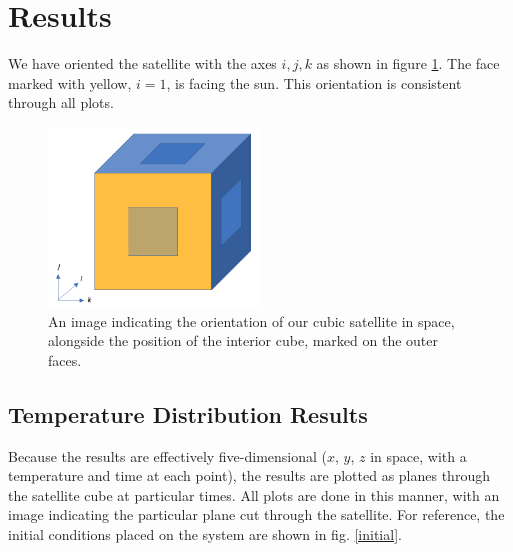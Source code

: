 \documentclass[12pt]{article}
\begin{document}
\section*{Results}
We have oriented the satellite with the axes $i, j,k$ as shown in figure \ref{justbox}.  The face marked with yellow, $i = 1$, is facing the sun.  This orientation is consistent through all plots.

\begin{figure}
\begin{center}
\includegraphics[width = 0.5\textwidth]{../pics/justbox.png}
\end{center}
\caption{\label{justbox} An image indicating the orientation of our cubic satellite in space, alongside the position of the interior cube, marked on the outer faces.}
\end{figure}
\subsection*{Temperature Distribution Results}
Because the results are effectively five-dimensional ($x$, $y$, $z$ in space, with a temperature and time at each point), the results are plotted as planes through the satellite cube at particular times.  All plots are done in this manner, with an image indicating the particular plane cut through the satellite.  For reference, the initial conditions placed on the system are shown in fig. \ref{initial}.
\end{document}
